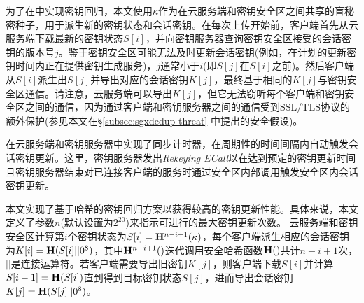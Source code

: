 为了在\sysnameS 中实现密钥回归，本文使用$\kappa$作为在云服务端和密钥安全区之间共享的盲秘密种子，用于派生新的密钥状态和会话密钥。在每次上传开始前，客户端首先从云服务端下载最新的密钥状态$S[i]$，并向密钥服务器查询密钥安全区接受的会话密钥的版本号$j$。鉴于密钥安全区可能无法及时更新会话密钥(例如，在计划的更新密钥时间内正在提供密钥生成服务)，$j$通常小于$i$(即$S[j]$在$S[i]$之前)。然后客户端从$S[i]$派生出$S[j]$并导出对应的会话密钥$K[j]$，最终基于相同的$K[j]$与密钥安全区通信。请注意，云服务端可以导出$K[j]$，但它无法窃听每个客户端和密钥安全区之间的通信，因为通过客户端和密钥服务器之间的通信受到SSL/TLS协议的额外保护(参见本文在\S\ref{subsec:sgxdedup-threat} 中提出的安全假设)。

\sysnameS 在云服务端和密钥服务器中实现了同步计时器，在周期性的时间间隔内自动触发会话密钥更新。这里，密钥服务器发出\textit{Rekeying ECall}以在达到预定的密钥更新时间且密钥服务器结束对已连接客户端的服务时通过安全区内部调用触发安全区内会话密钥更新。

本文实现了基于哈希的密钥回归方案以获得较高的密钥更新性能。具体来说，本文定义了参数$n$(默认设置为$2^{20}$)来指示可进行的最大密钥更新次数。 云服务端和密钥安全区计算第$i$个密钥状态为$S[i] = {\bf H}^{n-i+1}(\kappa)$，每个客户端派生相应的会话密钥为$K[i] = {\bf H}(S[i] || 0^8)$，其中${\bf H}^{n-i+1}()$迭代调用安全哈希函数${\bf H}()$共计$n-i+1$次，$||$是连接运算符。若客户端需要导出旧密钥$K[j]$，则客户端下载$S[i]$并计算$S[i-1] = {\bf H}(S[i])$直到得到目标密钥状态$S[j]$，进而导出会话密钥$K[j] = {\bf H}(S[j] || 0^8)$。
